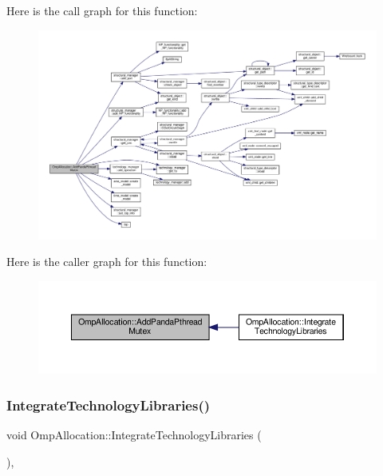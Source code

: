 Here is the call graph for this function\+:
\nopagebreak
\begin{figure}[H]
\begin{center}
\leavevmode
\includegraphics[width=350pt]{d9/dd3/classOmpAllocation_a5a8ea4456a4be776f88dee04f0a5cc6e_cgraph}
\end{center}
\end{figure}
Here is the caller graph for this function\+:
\nopagebreak
\begin{figure}[H]
\begin{center}
\leavevmode
\includegraphics[width=350pt]{d9/dd3/classOmpAllocation_a5a8ea4456a4be776f88dee04f0a5cc6e_icgraph}
\end{center}
\end{figure}
\mbox{\label{classOmpAllocation_a7be1bcabcbba606451d0abe4e70970f2}} 
\subsubsection{\texorpdfstring{Integrate\+Technology\+Libraries()}{IntegrateTechnologyLibraries()}}
{\footnotesize\ttfamily void Omp\+Allocation\+::\+Integrate\+Technology\+Libraries (\begin{DoxyParamCaption}{ }\end{DoxyParamCaption})\hspace{0.3cm}{\ttfamily [protected]}, {\ttfamily [virtual]}}



